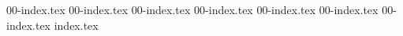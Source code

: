{00-index.tex}
{00-index.tex}
{00-index.tex}
{00-index.tex}
{00-index.tex}
{00-index.tex}
{00-index.tex}
{index.tex}



\begin{appendices}
    
\end{appendices}
